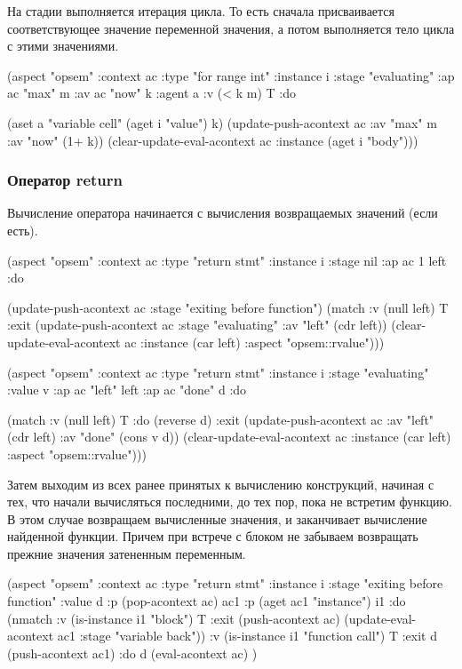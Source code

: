 \documentclass[12pt,twoside,russian]{article}
\newcommand{\textGoKeyword}[1]{{\color{goPurple}\textbf{#1}}}
\newcommand{\textABMLString}[1]{{\color{abmlString}#1}}
\newcommand{\GoKeyword}[1]{\goinline{\textGoKeyword{#1}}}
\newcommand{\ABMLString}[1]{\abmlinline{\textABMLString{#1}}}
\begin{document}
На стадии \ABMLString{evaluating} выполняется итерация цикла. То есть сначала присваивается соответствующее значение переменной значения, а потом выполняется тело цикла с этими значениями.

\begin{ABMLCode}
(aspect "opsem" :context ac :type "for range int" :instance i 
  :stage "evaluating" :ap ac "max" m :av ac "now" k 
  :agent a :v (< k m) T :do 
  
  (aset a "variable cell" (aget i "value") k)
  (update-push-acontext ac :av "max" m :av "now" (1+ k))
  (clear-update-eval-acontext ac :instance (aget i "body")))
\end{ABMLCode}

\subsubsection{Оператор return}

Вычисление оператора \GoKeyword{return} начинается с вычисления возвращаемых значений (если есть).

\begin{ABMLCode}
(aspect "opsem" :context ac :type "return stmt" :instance i 
  :stage nil :ap ac 1 left :do 
  
  (update-push-acontext ac :stage "exiting before function")
  (match :v (null left) T :exit 
    (update-push-acontext ac :stage "evaluating" 
      :av "left" (cdr left))
    (clear-update-eval-acontext ac :instance (car left) 
      :aspect "opsem::rvalue")))

(aspect "opsem" :context ac :type "return stmt" :instance i 
  :stage "evaluating" :value v :ap ac "left" left 
  :ap ac "done" d :do 
  
  (match :v (null left) T 
  :do (reverse d) 
  :exit 
  (update-push-acontext ac :av "left" (cdr left) :av "done" (cons v d))
  (clear-update-eval-acontext ac :instance (car left) 
    :aspect "opsem::rvalue")))
\end{ABMLCode}

Затем выходим из всех ранее принятых к вычислению конструкций, начиная с тех, что начали вычисляться последними, до тех пор, пока не встретим функцию. В этом случае возвращаем вычисленные значения, и заканчивает вычисление найденной функции. Причем при встрече с блоком не забываем возвращать прежние значения затененным переменным.

\begin{ABMLCode}
(aspect "opsem" :context ac :type "return stmt" :instance i :stage "exiting before function" 
    :value d :p (pop-acontext ac) ac1 :p (aget ac1 "instance") i1 :do 
    (nmatch :v (is-instance i1 "block") T 
    :exit (push-acontext ac) (update-eval-acontext ac1 :stage "variable back"))
    :v (is-instance i1 "function call") T 
    :exit d (push-acontext ac1)
    :do d (eval-acontext ac)
)
\end{ABMLCode}
\end{document}
